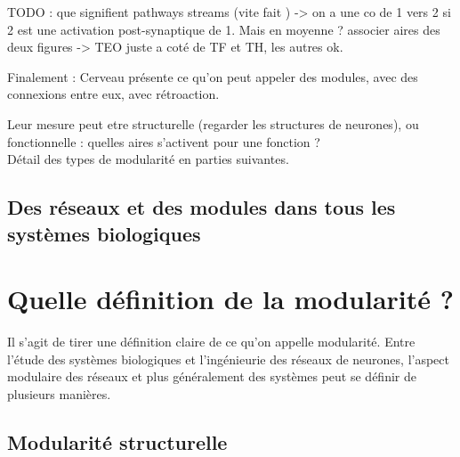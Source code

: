 
TODO : que signifient pathways streams (vite fait ) -> on a une co de 1 vers 2 si 2 est une activation post-synaptique de 1. Mais en moyenne ? 
associer aires des deux figures -> TEO juste a coté de TF et TH, les autres ok.


Finalement : 
Cerveau présente ce qu'on peut appeler des modules, avec des connexions entre eux, avec rétroaction. 

Leur mesure peut etre structurelle (regarder les structures de neurones), ou fonctionnelle : quelles aires s'activent pour une fonction ? \\
Détail des types de modularité en parties suivantes. 

\subsection{Des réseaux et des modules dans tous les systèmes biologiques}


\section{Quelle définition de la modularité ?}

Il s'agit de tirer une définition claire de ce qu'on appelle modularité. Entre l'étude des systèmes biologiques et l'ingénieurie des réseaux de neurones, l'aspect modulaire des réseaux et plus généralement des systèmes peut se définir de plusieurs manières. 

\subsection{Modularité structurelle}

